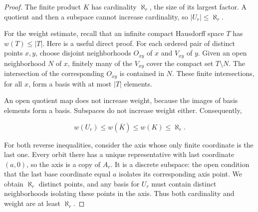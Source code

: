 \begin{proof}
The finite product \(K\) has cardinality \(\aleph_r\), the size of its
largest factor. A quotient and then a subspace cannot increase
cardinality, so \(|U_r|\leq\aleph_r\).

For the weight estimate, recall that an infinite compact Hausdorff
space \(T\) has \(w(T)\leq|T|\). Here is a useful direct proof.
For each ordered pair of distinct points \(x,y\), choose disjoint
neighborhoods \(O_{xy}\) of \(x\) and \(V_{xy}\) of \(y\).
Given an open neighborhood \(N\) of \(x\), finitely many of the \(V_{xy}\)
cover the compact set \(T\setminus N\). The intersection of the
corresponding \(O_{xy}\) is contained in \(N\). These finite
intersections, for all \(x\), form a basis with at most \(|T|\)
elements.

An open quotient map does not increase weight, because the images of
basis elements form a basis. Subspaces do not increase weight either.
Consequently,

\[
w(U_r)\leq w(\overline K)\leq w(K)\leq\aleph_r.
\]

For both reverse inequalities, consider the axis whose only finite
coordinate is the last one. Every orbit there has a unique
representative with last coordinate \((a,0)\), so the axis is a copy
of \(A_r\). It is a discrete subspace: the open condition that the
last base coordinate equal \(a\) isolates its corresponding axis
point. We obtain \(\aleph_r\) distinct points, and any basis for
\(U_r\) must contain distinct neighborhoods isolating these points
in the axis. Thus both cardinality and weight are at least
\(\aleph_r\).
\end{proof}
